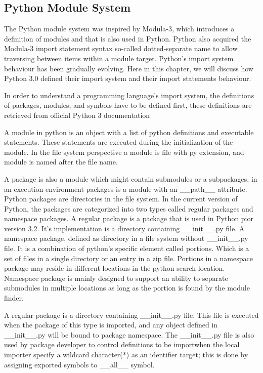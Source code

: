 \subsection{Python Module System}

The Python module system was inspired by Modula-3, which introduces a definition of modules and that is also used in Python.  Python also acquired the Modula-3 import statement syntax so-called dotted-separate name to allow traversing between items within a module target.  Python’s import system behaviour has been gradually evolving. Here in this chapter, we will discuss how Python 3.0 defined their import system and their import statements behaviour.

In order to understand a programming language’s import system, the definitions of packages, modules, and symbols have to be defined first, these definitions are retrieved from official Python 3 documentation

A module in python is an object with a list of python definitions and executable statements. These statements are executed during the initialization of the module. In the file system perspective a module is file with py extension, and module is named after the file name.

A package is also a module which might contain submodules or a subpackages, in an execution environment packages is a module with an \_\_path\_\_ attribute. Python packages are directories in the file system. In the current version of Python, the packages are categorized into two types called regular packages and namespace packages. A regular package is a package that is used in Python pior version 3.2. It’s implementation is a directory containing \_\_init\_\_.py file. A namespace package, defined as directory in a file system without \_\_init\_\_.py file. It is a combination of python’s specific element called portions. Which is a set of files in a single directory or an entry in a zip file. Portions in a namespace package may reside in different locations in the python search location. Namespace package is mainly designed to support an ability to separate submodules in multiple locations as long as the portion is found by the module finder.

A regular package is a directory containing \_\_init\_\_.py file. This file is executed when the package of this type is imported, and any object defined in \_\_init\_\_.py will be bound to package namespace. The \_\_init\_\_.py file is also used by package developer to control definitions to be importwhen the local importer specify a wildcard character(*) as an identifier target; this is done by assigning exported symbols to \_\_all\_\_  symbol.

